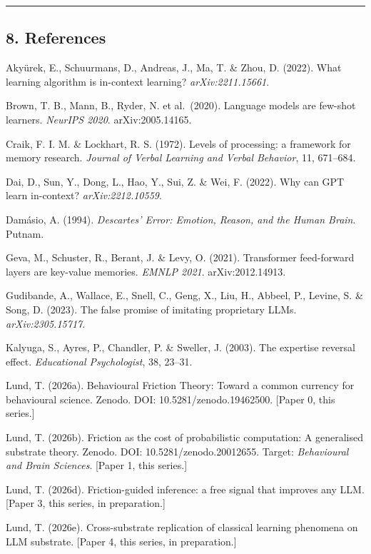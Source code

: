 \documentclass[
]{article}
\begin{document}
\begin{center}\rule{0.5\linewidth}{0.5pt}\end{center}

\subsection{8. References}\label{references}

Akyürek, E., Schuurmans, D., Andreas, J., Ma, T. \& Zhou, D. (2022).
What learning algorithm is in-context learning? \emph{arXiv:2211.15661}.

Brown, T. B., Mann, B., Ryder, N. et al.~(2020). Language models are
few-shot learners. \emph{NeurIPS 2020}. arXiv:2005.14165.

Craik, F. I. M. \& Lockhart, R. S. (1972). Levels of processing: a
framework for memory research. \emph{Journal of Verbal Learning and
Verbal Behavior}, 11, 671--684.

Dai, D., Sun, Y., Dong, L., Hao, Y., Sui, Z. \& Wei, F. (2022). Why can
GPT learn in-context? \emph{arXiv:2212.10559}.

Damásio, A. (1994). \emph{Descartes' Error: Emotion, Reason, and the
Human Brain}. Putnam.

Geva, M., Schuster, R., Berant, J. \& Levy, O. (2021). Transformer
feed-forward layers are key-value memories. \emph{EMNLP 2021}.
arXiv:2012.14913.

Gudibande, A., Wallace, E., Snell, C., Geng, X., Liu, H., Abbeel, P.,
Levine, S. \& Song, D. (2023). The false promise of imitating
proprietary LLMs. \emph{arXiv:2305.15717}.

Kalyuga, S., Ayres, P., Chandler, P. \& Sweller, J. (2003). The
expertise reversal effect. \emph{Educational Psychologist}, 38, 23--31.

Lund, T. (2026a). Behavioural Friction Theory: Toward a common currency
for behavioural science. Zenodo. DOI: 10.5281/zenodo.19462500. {[}Paper
0, this series.{]}

Lund, T. (2026b). Friction as the cost of probabilistic computation: A
generalised substrate theory. Zenodo. DOI: 10.5281/zenodo.20012655.
Target: \emph{Behavioural and Brain Sciences}. {[}Paper 1, this
series.{]}

Lund, T. (2026d). Friction-guided inference: a free signal that improves
any LLM. {[}Paper 3, this series, in preparation.{]}

Lund, T. (2026e). Cross-substrate replication of classical learning
phenomena on LLM substrate. {[}Paper 4, this series, in preparation.{]}
\end{document}
